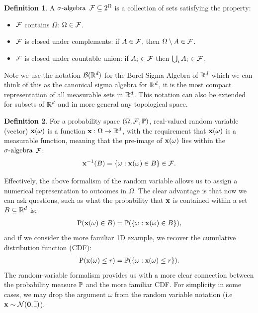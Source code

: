 \documentclass[a4paper,12pt,twoside,openright]{report}
\theoremstyle{definition}
\newtheorem{definition}{Definition}[section]
\begin{document}
\begin{definition}\label{def:sigma_algebra}
A $\sigalg$ $\calF \subseteq 2^{\Omega}$ is a collection of sets satisfying the property:
\begin{itemize}
    \item $\calF$ contains $\Omega$: $\Omega \in \calF$.
    \item $\calF$ is closed under complements: if $A\in\calF$, then $\Omega \setminus A \in \calF$.
    \item $\calF$ is closed under countable union:  if $A_i \in \calF$ then $\bigcup_i A_i \in \calF$.
\end{itemize}
\end{definition}

Note we use the notation $\calB(\R^d)$ for the Borel Sigma Algebra of $\R^d$ which we can think of this as the canonical sigma algebra for $\R^d$, it is the most compact representation of all measurable sets in $\R^d$. This notation can also be extended for subsets of $\R^d$ and in more general any topological space.

\begin{definition}\label{def:random_variable}
For a probability space $\probspace$, real-valued random variable (vector) $\rvx(\omega)$ is a function $\rvx :\Omega \rightarrow \R^d$, with the requirement that $\rvx(\omega)$ is a measurable function, meaning that the pre-image of $\rvx(\omega)$  lies within the $\sigalg$ $\calF$:
\begin{align*}
    \rvx^{-1}(B)= \{\omega : \rvx(\omega) \in B \} \in \calF .
\end{align*}
\end{definition}
Effectively, the above formalism of the random variable allows us to assign a numerical representation to outcomes in $\Omega$. The clear advantage is that now we can ask questions, such as what the probability that $\rvx$ is contained within a set $B \subseteq \R^d$ is:
\begin{align*}
     \text{P}(\rvx(\omega) \in B) = \P( \{\omega : \rvx(\omega) \in B \} ),
\end{align*}
 and if we consider the more familiar 1D example, we recover the cumulative distribution function (CDF):
 \begin{align*}
     \text{P}(\rx(\omega) \leq r) = \P( \{\omega : \rx(\omega) \leq r \} ).
 \end{align*}
 The random-variable formalism provides us with a more clear connection between the probability measure $\P$ and the more familiar CDF. For simplicity in some cases, we may drop the argument $\omega$ from the random variable notation (i.e $\rvx \sim \calN(\bm{0}, \mathbb{I})$). 
\end{document}
